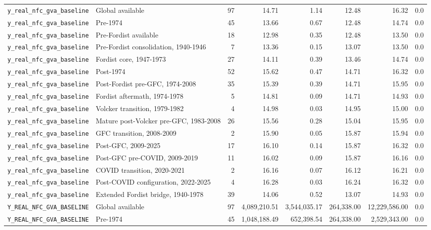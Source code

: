\begin{landscape}
\begin{longtable}{p{4.4cm}p{3.8cm}rrrrrr}
\\
\nolinkurl{y_real_nfc_gva_baseline} & Global available & 97 & 14.71 & 1.14 & 12.48 & 16.32 & 0.0
\\
\nolinkurl{y_real_nfc_gva_baseline} & Pre-1974 & 45 & 13.66 & 0.67 & 12.48 & 14.74 & 0.0
\\
\nolinkurl{y_real_nfc_gva_baseline} & Pre-Fordist available & 18 & 12.98 & 0.35 & 12.48 & 13.50 & 0.0
\\
\nolinkurl{y_real_nfc_gva_baseline} & Pre-Fordist consolidation, 1940-1946 & 7 & 13.36 & 0.15 & 13.07 & 13.50 & 0.0
\\
\nolinkurl{y_real_nfc_gva_baseline} & Fordist core, 1947-1973 & 27 & 14.11 & 0.39 & 13.46 & 14.74 & 0.0
\\
\nolinkurl{y_real_nfc_gva_baseline} & Post-1974 & 52 & 15.62 & 0.47 & 14.71 & 16.32 & 0.0
\\
\nolinkurl{y_real_nfc_gva_baseline} & Post-Fordist pre-GFC, 1974-2008 & 35 & 15.39 & 0.39 & 14.71 & 15.95 & 0.0
\\
\nolinkurl{y_real_nfc_gva_baseline} & Fordist aftermath, 1974-1978 & 5 & 14.81 & 0.09 & 14.71 & 14.93 & 0.0
\\
\nolinkurl{y_real_nfc_gva_baseline} & Volcker transition, 1979-1982 & 4 & 14.98 & 0.03 & 14.95 & 15.00 & 0.0
\\
\nolinkurl{y_real_nfc_gva_baseline} & Mature post-Volcker pre-GFC, 1983-2008 & 26 & 15.56 & 0.28 & 15.04 & 15.95 & 0.0
\\
\nolinkurl{y_real_nfc_gva_baseline} & GFC transition, 2008-2009 & 2 & 15.90 & 0.05 & 15.87 & 15.94 & 0.0
\\
\nolinkurl{y_real_nfc_gva_baseline} & Post-GFC, 2009-2025 & 17 & 16.10 & 0.14 & 15.87 & 16.32 & 0.0
\\
\nolinkurl{y_real_nfc_gva_baseline} & Post-GFC pre-COVID, 2009-2019 & 11 & 16.02 & 0.09 & 15.87 & 16.16 & 0.0
\\
\nolinkurl{y_real_nfc_gva_baseline} & COVID transition, 2020-2021 & 2 & 16.16 & 0.07 & 16.12 & 16.21 & 0.0
\\
\nolinkurl{y_real_nfc_gva_baseline} & Post-COVID configuration, 2022-2025 & 4 & 16.28 & 0.03 & 16.24 & 16.32 & 0.0
\\
\nolinkurl{y_real_nfc_gva_baseline} & Extended Fordist bridge, 1940-1978 & 39 & 14.06 & 0.52 & 13.07 & 14.93 & 0.0
\\
\nolinkurl{Y_REAL_NFC_GVA_BASELINE} & Global available & 97 & 4,089,210.51 & 3,544,035.17 & 264,338.00 & 12,229,586.00 & 0.0
\\
\nolinkurl{Y_REAL_NFC_GVA_BASELINE} & Pre-1974 & 45 & 1,048,188.49 & 652,398.54 & 264,338.00 & 2,529,343.00 & 0.0

\end{longtable}
\end{landscape}
